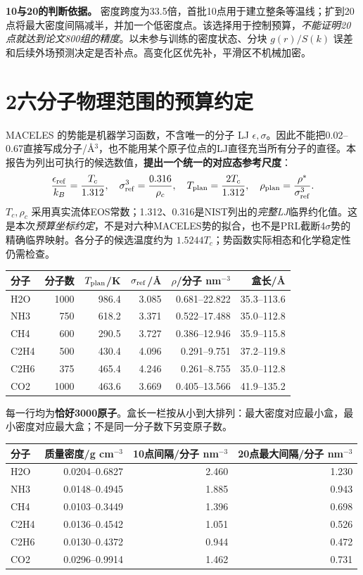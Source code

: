 \documentclass[a4paper]{ctexart}
\begin{document}
\textbf{10与20的判断依据。} 密度跨度为33.5倍，首批10点用于建立整条等温线；扩到20点将最大密度间隔减半，并加一个低密度点。该选择用于控制预算，\emph{不能证明20点就达到论文800组的精度}。以未参与训练的密度状态、分块 $g(r)/S(k)$ 误差和后续外场预测决定是否补点。高变化区优先补，平滑区不机械加密。

\clearpage
\section*{2\quad 六分子物理范围的预算约定}
MACELES 的势能是机器学习函数，不含唯一的分子 LJ $\epsilon,\sigma$。因此不能把0.02--0.67直接写成分子/\AA$^3$，也不能用某个原子位点的LJ直径充当所有分子的直径。本报告为列出可执行的候选数值，\textbf{提出一个统一的对应态参考尺度}：
\[
\frac{\epsilon_{\rm ref}}{k_B}=\frac{T_c}{1.312},\quad
\sigma_{\rm ref}^3=\frac{0.316}{\rho_c},\quad
T_{\rm plan}=\frac{2T_c}{1.312},\quad
\rho_{\rm plan}=\frac{\rho^*}{\sigma_{\rm ref}^3}.
\]
$T_c,\rho_c$ 采用真实流体EOS常数；1.312、0.316是NIST列出的\emph{完整LJ}临界约化值。这是本次\emph{预算坐标约定}，不是对六种MACELES势的拟合，也不是PRL截断4$\sigma$势的精确临界映射。各分子的候选温度约为 $1.5244T_c$；势函数实际相态和化学稳定性仍需检查。

\begin{center}\small
\begin{tabular}{lrrrrr}\toprule
分子 & 分子数 & $T_{\rm plan}$/K & $\sigma_{\rm ref}$/\AA & $\rho$/分子 nm$^{-3}$ & 盒长/\AA\\\midrule
H2O & 1000 & 986.4 & 3.085 & 0.681--22.822 & 35.3--113.6 \\
NH3 & 750 & 618.2 & 3.371 & 0.522--17.488 & 35.0--112.8 \\
CH4 & 600 & 290.5 & 3.727 & 0.386--12.946 & 35.9--115.8 \\
C2H4 & 500 & 430.4 & 4.096 & 0.291--9.751 & 37.2--119.8 \\
C2H6 & 375 & 465.4 & 4.246 & 0.261--8.755 & 35.0--112.8 \\
CO2 & 1000 & 463.6 & 3.669 & 0.405--13.566 & 41.9--135.2 \\
\bottomrule\end{tabular}\end{center}
每一行均为\textbf{恰好3000原子}。盒长一栏按从小到大排列：最大密度对应最小盒，最小密度对应最大盒；不是同一分子数下另变原子数。

\begin{center}\small
\begin{tabular}{lrrr}\toprule
分子 & 质量密度/g cm$^{-3}$ & 10点间隔/分子 nm$^{-3}$ & 20点最大间隔/分子 nm$^{-3}$\\\midrule
H2O & 0.0204--0.6827 & 2.460 & 1.230 \\
NH3 & 0.0148--0.4945 & 1.885 & 0.943 \\
CH4 & 0.0103--0.3449 & 1.396 & 0.698 \\
C2H4 & 0.0136--0.4542 & 1.051 & 0.526 \\
C2H6 & 0.0130--0.4372 & 0.944 & 0.472 \\
CO2 & 0.0296--0.9914 & 1.462 & 0.731 \\
\bottomrule\end{tabular}\end{center}
\end{document}
